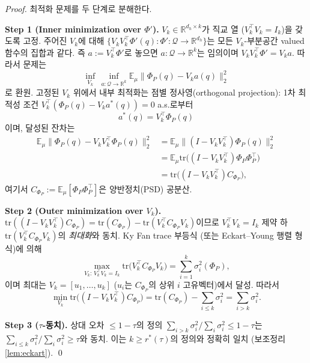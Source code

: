 \documentclass[11pt]{article}
\theoremstyle{definition}
\newcommand{\R}{\mathbb{R}}
\newcommand{\E}{\mathbb{E}}
\newcommand{\Phip}{\Phi_P}
\newcommand{\dh}{d_h}
\begin{document}
\begin{proof}
최적화 문제를 두 단계로 분해한다.

\textbf{Step 1 (Inner minimization over $\Phi'$).}
$V_k \in \R^{\dh\times k}$가 직교 열 ($V_k^\top V_k = I_k$)을 갖도록 고정. 주어진 $V_k$에 대해 $\{V_k V_k^\top \Phi'(q) : \Phi': \mathcal{Q}\to\R^{\dh}\}$는 모든 $V_k$-부분공간 valued 함수의 집합과 같다. 즉 $a := V_k^\top \Phi'$로 놓으면 $a: \mathcal{Q}\to\R^k$는 임의이며 $V_k V_k^\top \Phi' = V_k a$. 따라서 문제는
\begin{equation}
\inf_{V_k} \, \inf_{a:\mathcal{Q}\to\R^k} \E_\mu \bigl\| \Phip(q) - V_k a(q) \bigr\|_2^2
\end{equation}
로 환원. 고정된 $V_k$ 위에서 내부 최적화는 점별 정사영(orthogonal projection): 1차 최적성 조건 $V_k^\top(\Phip(q) - V_k a^*(q)) = 0$ a.s.로부터
\begin{equation}
a^*(q) = V_k^\top \Phip(q)
\end{equation}
이며, 달성된 잔차는
\begin{align}
\E_\mu \bigl\| \Phip(q) - V_k V_k^\top \Phip(q) \bigr\|_2^2
&= \E_\mu \bigl\| (I - V_k V_k^\top) \Phip(q) \bigr\|_2^2 \\
&= \E_\mu \mathrm{tr}\bigl((I - V_k V_k^\top) \Phip\Phip^\top\bigr) \\
&= \mathrm{tr}\bigl((I - V_k V_k^\top) C_{\Phip}\bigr),
\end{align}
여기서 $C_{\Phip} := \E_\mu[\Phip\Phip^\top]$은 양반정치(PSD) 공분산.

\textbf{Step 2 (Outer minimization over $V_k$).}
$\mathrm{tr}((I - V_k V_k^\top) C_{\Phip}) = \mathrm{tr}(C_{\Phip}) - \mathrm{tr}(V_k^\top C_{\Phip} V_k)$이므로 $V_k^\top V_k = I_k$ 제약 하 $\mathrm{tr}(V_k^\top C_{\Phip} V_k)$의 \emph{최대화}와 동치. Ky Fan trace 부등식 (또는 Eckart--Young 행렬 형식)에 의해
\begin{equation}
\max_{V_k:\, V_k^\top V_k = I_k} \mathrm{tr}\bigl(V_k^\top C_{\Phip} V_k\bigr) = \sum_{i=1}^k \sigma_i^2(\Phip),
\end{equation}
이며 최대는 $V_k = [u_1, \dots, u_k]$ ($u_i$는 $C_{\Phip}$의 상위 $i$ 고유벡터)에서 달성. 따라서
\begin{equation}
\min_{V_k} \mathrm{tr}\bigl((I - V_k V_k^\top) C_{\Phip}\bigr) = \mathrm{tr}(C_{\Phip}) - \sum_{i\le k}\sigma_i^2 = \sum_{i>k}\sigma_i^2.
\end{equation}

\textbf{Step 3 ($\tau$-동치).}
상대 오차 $\le 1-\tau$의 정의 $\sum_{i>k}\sigma_i^2 / \sum_i \sigma_i^2 \le 1-\tau$는 $\sum_{i\le k}\sigma_i^2 / \sum_i \sigma_i^2 \ge \tau$와 동치. 이는 $k \ge r^*(\tau)$의 정의와 정확히 일치 (보조정리 \ref{lem:eckart}). \qed
\end{proof}
\end{document}
